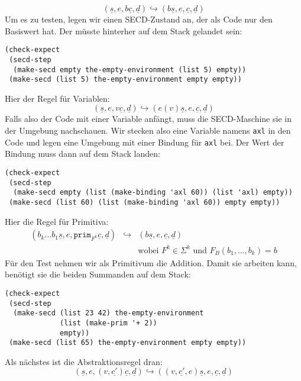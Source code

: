 %
\begin{displaymath}
  (\underline{s}, e, b\underline{c}, \underline{d})
  \hookrightarrow
  (b\underline{s}, e, \underline{c}, \underline{d})
\end{displaymath}
%
Um es zu testen, legen wir einen SECD-Zustand an, der als Code nur den
Basiswert hat.  Der müsste hinterher auf dem Stack gelandet sein:
%
\begin{lstlisting}
(check-expect
 (secd-step
  (make-secd empty the-empty-environment (list 5) empty))
 (make-secd (list 5) the-empty-environment empty empty))
\end{lstlisting}
%
Hier der Regel für Variablen:
%
\begin{displaymath}
  (\underline{s}, e, v\underline{c}, \underline{d})
  \hookrightarrow
  (e(v)\underline{s}, e, \underline{c}, \underline{d})
\end{displaymath}
%
Falls also der Code mit einer Variable anfängt, muss die SECD-Maschine
sie in der Umgebung nachschauen.  Wir stecken also eine Variable
namens \lstinline{axl} in den Code und legen eine Umgebung mit einer
Bindung für \lstinline{axl} bei.  Der Wert der Bindung muss dann auf
dem Stack landen:
%
\begin{lstlisting}
(check-expect
 (secd-step
  (make-secd empty (list (make-binding 'axl 60)) (list 'axl) empty))
 (make-secd (list 60) (list (make-binding 'axl 60)) empty empty))
\end{lstlisting}
%
Hier die Regel für Primitiva:
%
\begin{eqnarray*}
  (b_k\ldots b_1 \underline{s}, e, \mathtt{prim}_{F^k}\underline{c}, \underline{d})
  &\hookrightarrow&
  (b\underline{s}, e, \underline{c}, \underline{d})
  \\ && \textrm{wobei $F^k\in\Sigma^k$ und $F_B(b_1,\ldots,b_k) = b$}
\end{eqnarray*}
%
Für den Test nehmen wir als Primitivum die Addition.  Damit sie
arbeiten kann, benötigt sie die beiden Summanden auf dem Stack:
%
\begin{lstlisting}
(check-expect
 (secd-step
  (make-secd (list 23 42) the-empty-environment
             (list (make-prim '+ 2))
             empty))
 (make-secd (list 65) the-empty-environment empty empty))
\end{lstlisting}
%
Als nächstes ist die Abstraktionsregel dran:
%
\begin{displaymath}
  (\underline{s}, e, (v, \underline{c'}) \underline{c}, \underline{d})
  \hookrightarrow
  ((v, \underline{c'}, e) \underline{s}, e, \underline{c}, \underline{d})
\end{displaymath}
